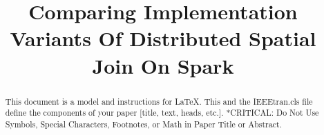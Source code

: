 \documentclass[conference]{IEEEtran}
\begin{document}
\title{Comparing Implementation Variants Of Distributed Spatial Join On Spark\\
}

\author{
\and
{}
}

\maketitle

\begin{abstract}
This document is a model and instructions for \LaTeX.
This and the IEEEtran.cls file define the components of your paper [title, text, heads, etc.]. *CRITICAL: Do Not Use Symbols, Special Characters, Footnotes, 
or Math in Paper Title or Abstract.
\end{abstract}

\end{document}

